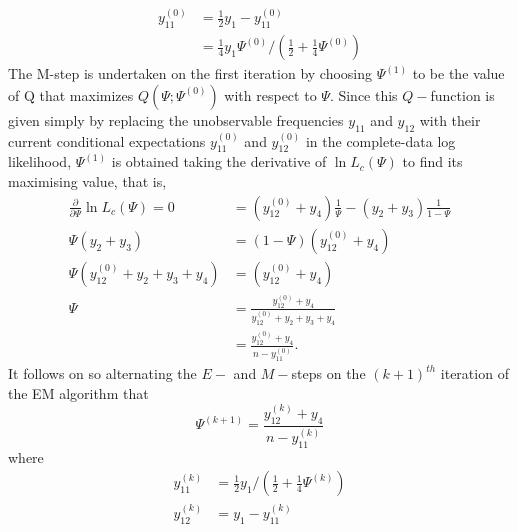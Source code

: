 \begin{exam}
\begin{align*}
        y_{11}^{(0)} & = \frac{1}{2} y_1 - y_{11}^{(0)}                                                     \\
                     & = \frac{1}{4} y_{1} \Psi^{(0)} / \left( \frac{1}{2} + \frac{1}{4} \Psi^{(0)} \right)
    \end{align*}
    The M-step is undertaken on the first iteration by choosing $\Psi^{(1)}$ to be the value of Q that maximizes $Q \left( \Psi ; \Psi^{(0)} \right)$ with respect to $\Psi$. Since this $Q-$function is given simply by replacing the unobservable frequencies $y_{11}$ and $y_{12}$ with their current conditional expectations $y_{11}^{(0)}$ and $y_{12}^{(0)}$ in the complete-data log likelihood, $\Psi^{(1)}$ is obtained taking the derivative of $\ln L_c (\Psi)$ to find its maximising value, that is,
    \begin{align*}
        \frac{\partial}{\partial \Psi} \ln L_c (\Psi) = 0  \
         & = \left( y_{12}^{(0)} + y_4 \right) \frac{1}{\Psi} - \left( y_2 + y_3 \right) \frac{1}{1-\Psi} \\
        \Psi \left( y_2 + y_3 \right)
         & = (1-\Psi) \left( y_{12}^{(0)} + y_4 \right)                                                   \\
        \Psi \left( y_{12}^{(0)} + y_2 + y_3 + y_4 \right)
         & = \left( y_{12}^{(0)} + y_4 \right)                                                            \\
        \Psi
         & = \frac{y_{12}^{(0)} + y_4}{y_{12}^{(0)} + y_2 + y_3 + y_4}                                    \\
         & = \frac{y_{12}^{(0)} + y_4}{n - y_{11}^{(0)}}.
    \end{align*}
    It follows on so alternating the $E-$ and $M-$steps on the $(k+1)^{th}$ iteration of the EM algorithm that
    \begin{equation*}
        \Psi^{(k+1)} = \frac{y_{12}^{(k)} + y_4}{n - y_{11}^{(k)}}
    \end{equation*}
    where
    \begin{align*}
        y_{11}^{(k)} & = \frac{1}{2} y_1 / \left( \frac{1}{2} + \frac{1}{4} \Psi^{(k)} \right) \\
        y_{12}^{(k)} & = y_1 - y_{11}^{(k)}
    \end{align*}
\end{exam}